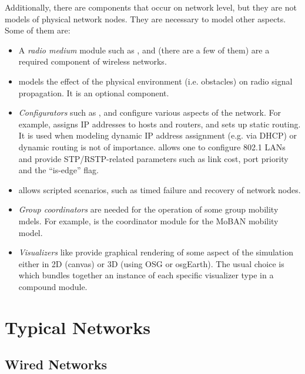Additionally, there are components that occur on network level, but they
are not models of physical network nodes. They are necessary 
to model other aspects. Some of them are:

\begin{itemize}
  \item A \textit{radio medium} module such as ,
      and  
     (there are a few of them) are a required component of wireless networks. 
  \item {} models the effect of the physical 
     environment (i.e. obstacles) on radio signal propagation. It is an
     optional component.
  \item \textit{Configurators} such as ,
      and 
     configure various aspects of the network. For example,  
      assigns IP addresses 
     to hosts and routers, and sets up static routing. It is used 
     when modeling dynamic IP address assignment (e.g. via DHCP) or 
     dynamic routing is not of importance.  
     allows one to configure 802.1 LANs and provide STP/RSTP-related 
     parameters such as link cost, port priority and the ``is-edge'' flag.
  \item {} allows scripted scenarios, such
     as timed failure and recovery of network nodes.
  \item \textit{Group coordinators} are needed for the operation of some 
     group mobility mdels. For example,  is 
     the coordinator module for the MoBAN mobility model.
  \item \textit{Visualizers} like  provide
     graphical rendering of some aspect of the simulation either in
     2D (canvas) or 3D (using OSG or osgEarth). The usual choice is 
      which bundles together an instance 
     of each specific visualizer type in a compound module.
\end{itemize}

\section{Typical Networks}

\subsection{Wired Networks}


